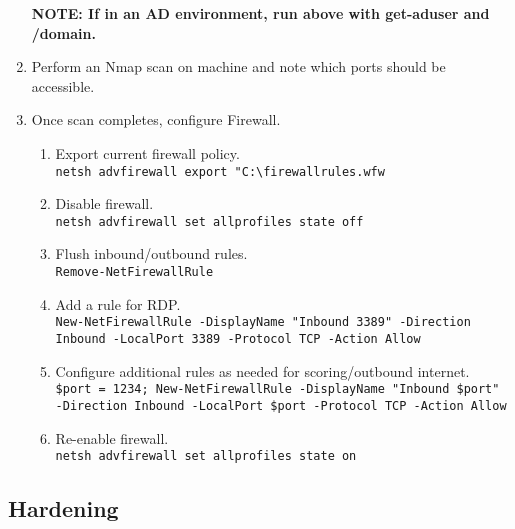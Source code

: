 \documentclass[12pt,letterpaper]{article}
\def\code#1{\textcolor{c2}{\texttt{#1}}}
\def\bf#1{\textbf{#1}}
\begin{document}
\begin{enumerate}
\begin{enumerate}
\begin{verbatim}
				\end{verbatim}
		\end{enumerate}
		\bf{NOTE: If in an AD environment, run above with get-aduser and /domain.}
	\item Perform an Nmap scan on machine and note which ports should be accessible.
	\item Once scan completes, configure Firewall.
		\begin{enumerate}
			\item Export current firewall policy. \\
				\code{netsh advfirewall export "C:\textbackslash{}firewallrules.wfw}
			\item Disable firewall. \\
				\code{netsh advfirewall set allprofiles state off}
			\item Flush inbound/outbound rules. \\
				\code{Remove-NetFirewallRule}
			\item Add a rule for RDP. \\
				\code{New-NetFirewallRule -DisplayName "Inbound 3389" -Direction Inbound -LocalPort 3389 -Protocol TCP -Action Allow}
			\item Configure additional rules as needed for scoring/outbound internet. \\
				\code{\$port = 1234; New-NetFirewallRule -DisplayName "Inbound \$port" -Direction Inbound -LocalPort \$port -Protocol TCP -Action Allow}
			\item Re-enable firewall. \\
				\code{netsh advfirewall set allprofiles state on}
		\end{enumerate}
\end{enumerate}

\subsection{Hardening}
\end{document}
